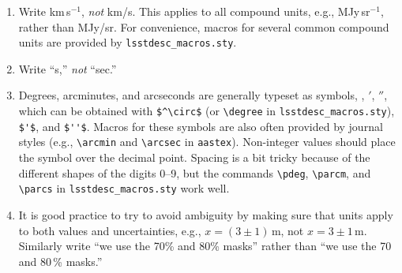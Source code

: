 \documentclass[letterpaper,11pt]{article}
\begin{document}
\begin{enumerate}
\item Write km\,s$^{-1}$, {\it not\/} km/s.  This applies to all compound
units, e.g., MJy\,sr$^{-1}$, rather than MJy/sr. For convenience, macros for several common compound units are provided by {\tt lsstdesc\_macros.sty}.

\item Write ``s,'' {\it not\/} ``sec.''


\item Degrees, arcminutes, and arcseconds are generally typeset as symbols,
\degree, $'$, $''$, which can be obtained with \verb|$^\circ$| (or \verb|\degree| in {\tt lsstdesc\_macros.sty}), \verb|$'$|, and \verb|$''$|. Macros for these symbols are also often provided by journal styles (e.g., \verb|\arcmin| and \verb|\arcsec| in {\tt aastex}). Non-integer values should place the symbol over the
decimal point.  Spacing is a bit tricky because of the different shapes of the
digits 0--9, but the commands \verb|\pdeg|, \verb|\parcm|, and \verb|\parcs| in {\tt lsstdesc\_macros.sty}
work well.  



\item It is good practice to try to avoid ambiguity by making sure that units
apply to both values and uncertainties, e.g., $x=(3\pm1)\,$m, not $x=3\pm1\,$m.
 Similarly write ``we use the 70\% and 80\% masks'' rather than ``we use
the 70 and 80\,\% masks.''





\end{enumerate}
\end{document}
